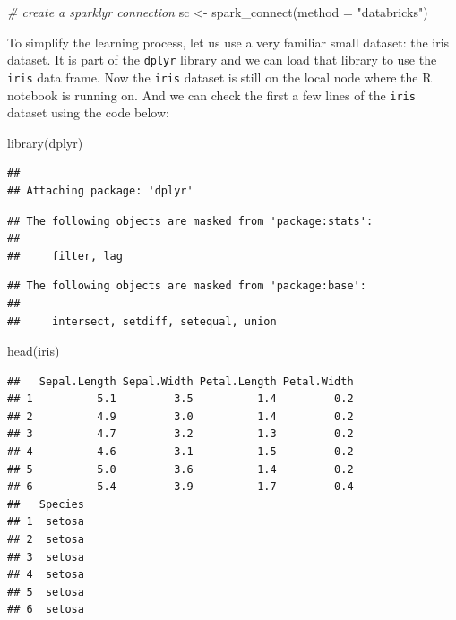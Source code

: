 \documentclass[
  12pt,
]{krantz}
\makeatletter
\newenvironment{Shaded}{\begin{snugshade}}{\end{snugshade}}
\newcommand{\AttributeTok}[1]{\textcolor[rgb]{0.61,0.61,0.61}{#1}}
\newcommand{\CommentTok}[1]{\textcolor[rgb]{0.37,0.37,0.37}{\textit{#1}}}
\newcommand{\FunctionTok}[1]{\textcolor[rgb]{0,0,0}{#1}}
\newcommand{\NormalTok}[1]{#1}
\newcommand{\OtherTok}[1]{\textcolor[rgb]{0.37,0.37,0.37}{#1}}
\newcommand{\StringTok}[1]{\textcolor[rgb]{0.5,0.5,0.5}{#1}}
\newenvironment{kframe}{%
\medskip{}
\setlength{\fboxsep}{.8em}
 \def\at@end@of@kframe{}%
 \ifinner\ifhmode%
  \def\at@end@of@kframe{\end{minipage}}%
  \begin{minipage}{\columnwidth}%
 \fi\fi%
 \def\FrameCommand##1{\hskip\@totalleftmargin \hskip-\fboxsep
 \colorbox{shadecolor}{##1}\hskip-\fboxsep
     \hskip-\linewidth \hskip-\@totalleftmargin \hskip\columnwidth}%
 \MakeFramed {\advance\hsize-\width
   \@totalleftmargin\z@ \linewidth\hsize
   \@setminipage}}%
 {\par\unskip\endMakeFramed%
 \at@end@of@kframe}
\renewenvironment{Shaded}{\begin{kframe}}{\end{kframe}}
\makeatother
\begin{document}
\begin{Shaded}
\begin{Highlighting}[]
\CommentTok{\# create a sparklyr connection}
\NormalTok{sc }\OtherTok{\textless{}{-}} \FunctionTok{spark\_connect}\NormalTok{(}\AttributeTok{method =} \StringTok{"databricks"}\NormalTok{)}
\end{Highlighting}
\end{Shaded}

To simplify the learning process, let us use a very familiar small dataset: the iris dataset. It is part of the \texttt{dplyr} library and we can load that library to use the \texttt{iris} data frame. Now the \texttt{iris} dataset is still on the local node where the R notebook is running on. And we can check the first a few lines of the \texttt{iris} dataset using the code below:

\begin{Shaded}
\begin{Highlighting}[]
\FunctionTok{library}\NormalTok{(dplyr)}
\end{Highlighting}
\end{Shaded}

\begin{verbatim}
## 
## Attaching package: 'dplyr'
\end{verbatim}

\begin{verbatim}
## The following objects are masked from 'package:stats':
## 
##     filter, lag
\end{verbatim}

\begin{verbatim}
## The following objects are masked from 'package:base':
## 
##     intersect, setdiff, setequal, union
\end{verbatim}

\begin{Shaded}
\begin{Highlighting}[]
\FunctionTok{head}\NormalTok{(iris)}
\end{Highlighting}
\end{Shaded}

\begin{verbatim}
##   Sepal.Length Sepal.Width Petal.Length Petal.Width
## 1          5.1         3.5          1.4         0.2
## 2          4.9         3.0          1.4         0.2
## 3          4.7         3.2          1.3         0.2
## 4          4.6         3.1          1.5         0.2
## 5          5.0         3.6          1.4         0.2
## 6          5.4         3.9          1.7         0.4
##   Species
## 1  setosa
## 2  setosa
## 3  setosa
## 4  setosa
## 5  setosa
## 6  setosa
\end{verbatim}
\end{document}
